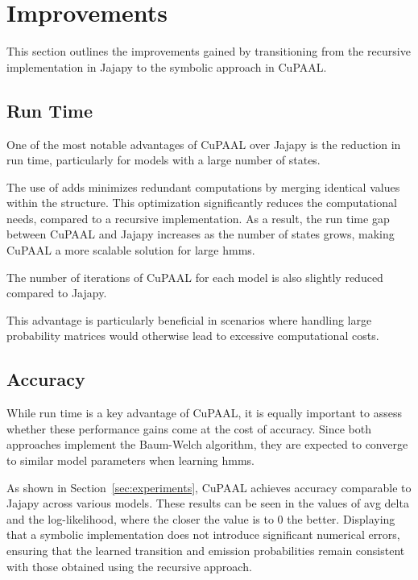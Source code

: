 \section{Improvements}\label{sec:improvements}
This section outlines the improvements gained by transitioning from the recursive implementation in Jajapy to the symbolic approach in CuPAAL.



\subsection{Run Time}\label{subsec:improvements_run_time}
One of the most notable advantages of CuPAAL over Jajapy is the reduction in run time, particularly for models with a large number of states.

The use of \glspl{add} minimizes redundant computations by merging identical values within the structure.
This optimization significantly reduces the computational needs, compared to a recursive implementation.
As a result, the run time gap between CuPAAL and Jajapy increases as the number of states grows, making CuPAAL a more scalable solution for large \glspl{hmm}.

The number of iterations of CuPAAL for each model is also slightly reduced compared to Jajapy.

This advantage is particularly beneficial in scenarios where handling large probability matrices would otherwise lead to excessive computational costs.


\subsection{Accuracy}\label{subsec:improvements_accuracy}
While run time is a key advantage of CuPAAL, it is equally important to assess whether these performance gains come at the cost of accuracy.
Since both approaches implement the Baum-Welch algorithm, they are expected to converge to similar model parameters when learning \glspl{hmm}.

As shown in Section~\ref{sec:experiments}, CuPAAL achieves accuracy comparable to Jajapy across various models.
These results can be seen in the values of avg delta and the log-likelihood, where the closer the value is to 0 the better.
Displaying that a symbolic implementation does not introduce significant numerical errors, ensuring that the learned transition and emission probabilities remain consistent with those obtained using the recursive approach.

